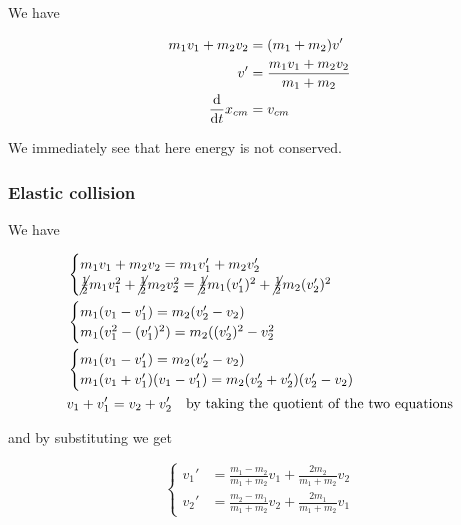 \documentclass[10pt]{extarticle}
\begin{document}
We have

\begin{align*}
    m_1 v_1 + m_2 v_2 & = (m_1 + m_2) v'                      \\
    v'                & = \frac{m_1 v_1 + m_2 v_2}{m_1 + m_2} \\
    \dv{t} x_{cm}     & = v_{cm}
\end{align*}

We immediately see that here energy is not conserved.

\subsubsection{Elastic collision}

We have

\begin{align*}
     & \begin{cases}
           m_1 v_1 + m_2 v_2 = m_1 v_1' + m_2 v_2' \\
           \cancel{\frac{1}{2}} m_1 v_1^2 + \cancel{\frac{1}{2}} m_2 v_2^2 = \cancel{\frac{1}{2}} m_1 (v_1')^2 + \cancel{\frac{1}{2}} m_2 (v_2')^2
       \end{cases} \\
     & \begin{cases}
           m_1(v_1 - v_1') = m_2(v_2' - v_2) \\
           m_1 (v_1^2 - (v_1')^2) = m_2 ((v_2')^2 - v_2^2
       \end{cases}                                                                                                                                          \\
     & \begin{cases}
           m_1(v_1 - v_1') = m_2(v_2' - v_2) \\
           m_1 (v_1 + v_1')(v_1 - v_1') = m_2 (v_2' + v_2')(v_2' - v_2)
       \end{cases}                                                                                                                            \\
     & v_1 + v_1' = v_2 + v_2'  \quad \text{by taking the quotient of the two equations}                                                                                                      \\
\end{align*}

and by substituting we get

$$
    \begin{cases}
        v_1' & = \frac{m_1 - m_2}{m_1 + m_2} v_1 + \frac{2 m_2}{m_1 + m_2} v_2 \\
        v_2' & = \frac{m_2 - m_1}{m_1 + m_2} v_2 + \frac{2 m_1}{m_1 + m_2} v_1
    \end{cases}
$$
\end{document}
